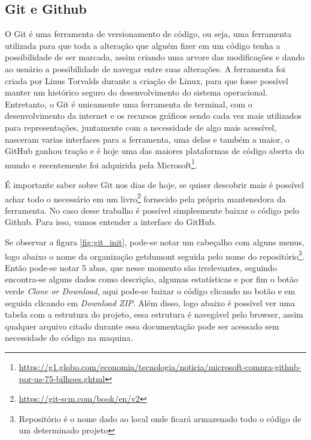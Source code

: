\subsection{Git e Github}
O Git é uma ferramenta de versionamento de código, ou seja, uma ferramenta utilizada para que toda a alteração que alguém fizer em um código tenha a possibilidade de ser marcada, assim criando uma arvore das modificações e dando ao usuário a possibilidade de navegar entre suas alterações. A ferramenta foi criada por Linus Torvalds durante a criação de Linux, para que fosse possível manter um histórico seguro do desenvolvimento do sistema operacional. Entretanto, o Git é unicamente uma ferramenta de terminal, com o desenvolvimento da internet e os recursos gráficos sendo cada vez mais utilizados para representações, juntamente com a necessidade de algo mais acessível, nasceram varias interfaces para a ferramenta, uma delas e também a maior, o GitHub ganhou tração e é hoje uma das maiores plataformas de código aberta do mundo e recentemente foi adquirida pela Microsoft\footnote{\url{https://g1.globo.com/economia/tecnologia/noticia/microsoft-compra-github-por-us-75-bilhoes.ghtml}}.

É importante saber sobre Git nos dias de hoje, se quiser descobrir mais é possível achar todo o necessário em um livro\footnote{\url{https://git-scm.com/book/en/v2}} fornecido pela própria mantenedora da ferramenta. No caso desse trabalho é possível simplesmente baixar o código pelo Github. Para isso, vamos entender a interface do GitHub.

Se observar a figura \ref{fig:git_init}, pode-se notar um cabeçalho com alguns menus, logo abaixo o nome da organização getdumont seguida pelo nome do repositório\footnote{Repositório é o nome dado ao local onde ficará armazenado todo o código de um determinado projeto}. Então pode-se notar 5 abas, que nesse momento são irrelevantes, seguindo encontra-se alguns dados como descrição, algumas estatísticas e por fim o botão verde \textit{Clone or Download}, aqui pode-se baixar o código clicando no botão e em seguida clicando em \textit{Download ZIP}. Além disso, logo abaixo é possível ver uma tabela com a estrutura do projeto, essa estrutura é navegável pelo browser, assim qualquer arquivo citado durante essa documentação pode ser acessado sem necessidade do código na maquina.

